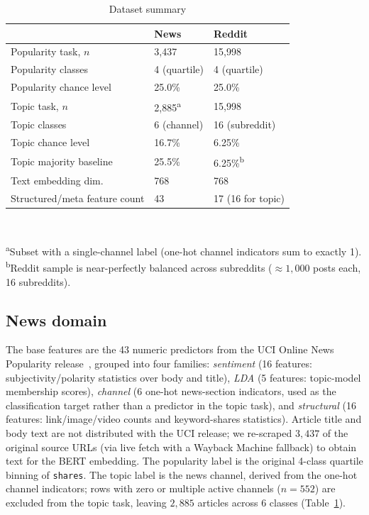 \documentclass[conference]{IEEEtran}
\begin{document}
\begin{table}[t]
\centering
\caption{Dataset summary}
\label{tab:dataset}
\begin{tabular}{@{}lll@{}}
\toprule
& \textbf{News} & \textbf{Reddit} \\
\midrule
Popularity task, $n$          & 3{,}437                  & 15{,}998 \\
Popularity classes            & 4 (quartile)             & 4 (quartile) \\
Popularity chance level       & 25.0\%                   & 25.0\% \\
Topic task, $n$                & 2{,}885\textsuperscript{a} & 15{,}998 \\
Topic classes                 & 6 (channel)              & 16 (subreddit) \\
Topic chance level             & 16.7\%                   & 6.25\% \\
Topic majority baseline        & 25.5\%                   & 6.25\%\textsuperscript{b} \\
Text embedding dim.             & 768                      & 768 \\
Structured/meta feature count   & 43                       & 17 (16 for topic) \\
\bottomrule
\end{tabular}
\\[2pt]
\raggedright\footnotesize\textsuperscript{a}Subset with a single-channel label (one-hot channel indicators sum to exactly 1). \textsuperscript{b}Reddit sample is near-perfectly balanced across subreddits ($\approx\!1{,}000$ posts each, 16 subreddits).
\end{table}

\subsection{News domain}
The base features are the 43 numeric predictors from the UCI Online News Popularity release~\cite{fernandes2015proactive}, grouped into four families: \emph{sentiment} (16 features: subjectivity/polarity statistics over body and title), \emph{LDA} (5 features: topic-model membership scores), \emph{channel} (6 one-hot news-section indicators, used as the classification target rather than a predictor in the topic task), and \emph{structural} (16 features: link/image/video counts and keyword-shares statistics). Article title and body text are not distributed with the UCI release; we re-scraped $3{,}437$ of the original source URLs (via live fetch with a Wayback Machine fallback) to obtain text for the BERT embedding. The popularity label is the original 4-class quartile binning of \texttt{shares}. The topic label is the news channel, derived from the one-hot channel indicators; rows with zero or multiple active channels ($n=552$) are excluded from the topic task, leaving $2{,}885$ articles across 6 classes (Table~\ref{tab:dataset}).
\end{document}

